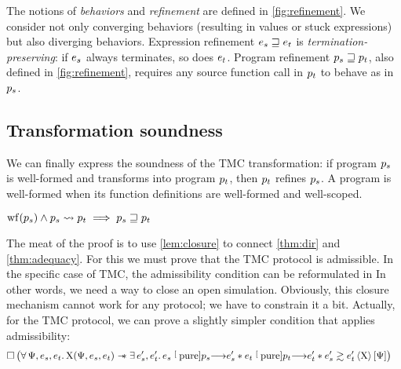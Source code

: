 The notions of \emph{behaviors} and \emph{refinement} are defined in \cref{fig:refinement}.
We consider not only converging behaviors (resulting in values or stuck expressions) but also diverging behaviors.
Expression refinement $\datalangExpr_s \refined \datalangExpr_t$ is \emph{termination-preserving}: if $\datalangExpr_s$ always terminates, so does $\datalangExpr_t$.
Program refinement $\datalangProg_s \refined \datalangProg_t$, also defined in \cref{fig:refinement}, requires any source function call in $\datalangProg_t$ to behave as in $\datalangProg_s$.
\subsection{Transformation soundness}

We can finally express the soundness of the TMC transformation: if program $\datalangProg_s$ is well-formed and transforms into program $\datalangProg_t$, then $\datalangProg_t$ refines $\datalangProg_s$.
A program is well-formed when its function definitions are well-formed and well-scoped.

\begin{theorem} \label{thm:soundness}
    $
        \wf{\datalangProg_s} \wedge \datalangProg_s \tmc \datalangProg_t \implies
        \datalangProg_s \refined \datalangProg_t
    $
\end{theorem}

The meat of the proof is to use \cref{lem:closure} to connect  \cref{thm:dir} and \cref{thm:adequacy}.
For this we must prove that the TMC protocol is admissible.
In the specific case of TMC, the admissibility condition
can be reformulated in 
In other words, we need a way to close an open simulation.
Obviously, this closure mechanism cannot work for any protocol; we have to constrain it a bit.
Actually, for the TMC protocol, we can prove a slightly simpler condition that applies admissibility:
    \begin{align*}
            &
            \iPersistent \left(
                \forall \iPredTwo, \datalangExpr_s, \datalangExpr_t \ldotp
                \iProt (\iPredTwo, \datalangExpr_s, \datalangExpr_t) \iWand
                \exists \datalangExpr_s', \datalangExpr_t' \ldotp
                \datalangExpr_s \pureStep{\datalangProg_s} \datalangExpr_s' \iSep
                \datalangExpr_t \pureStep{\datalangProg_t} \datalangExpr_t' \iSep
                \iSim[\iProt]{\iPredTwo}{\datalangExpr_s'}{\datalangExpr_t'}
            \right) 
    \end{align*}


